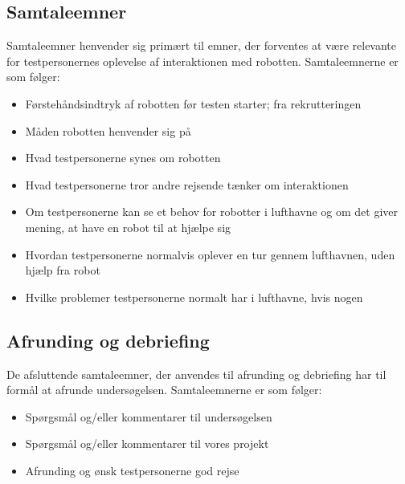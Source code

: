 \subsection{Samtaleemner} 
\label{ParametreSamtaleemner}
%
Samtaleemner henvender sig primært til emner, der forventes at være relevante for testpersonernes oplevelse af interaktionen med robotten. Samtaleemnerne er som følger:\blankline
%
\begin{itemize}
\item Førstehåndsindtryk af robotten før testen starter; fra rekrutteringen
\item Måden robotten henvender sig på
\item Hvad testpersonerne synes om robotten
\item Hvad testpersonerne tror andre rejsende tænker om interaktionen 
\item Om testpersonerne kan se et behov for robotter i lufthavne og om det giver mening, at have en robot til at hjælpe sig
\item Hvordan testpersonerne normalvis oplever en tur gennem lufthavnen, uden hjælp fra robot
\item Hvilke problemer testpersonerne normalt har i lufthavne, hvis nogen 
\end{itemize}
%
\subsection{Afrunding og debriefing} 
\label{ParametreAfrundingDebriefing}
%
De afsluttende samtaleemner, der anvendes til afrunding og debriefing har til formål at afrunde undersøgelsen. Samtaleemnerne er som følger: \blankline
%
\begin{itemize}
\item Spørgsmål og/eller kommentarer til undersøgelsen 
\item Spørgsmål og/eller kommentarer til vores projekt
\item Afrunding og ønsk testpersonerne god rejse
\end{itemize}

